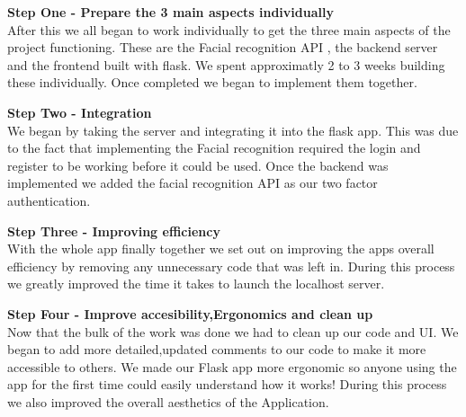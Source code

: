 \documentclass{article}
\begin{document}
\textbf{Step One - Prepare the 3 main aspects individually} \\
After this we all began to work individually to get the three main aspects of the project functioning. These are the Facial recognition API , the backend server and the frontend built with flask. We spent approximatly 2 to 3 weeks building these individually. Once completed we began to implement them together.\medskip

\textbf{Step Two - Integration} \\
We began by taking the server and integrating it into the flask app. This was due to the fact that implementing the Facial recognition required the login and register to be working before it could be used.
Once the backend was implemented we added the facial recognition API as our two factor authentication.\medskip

\textbf{Step Three - Improving efficiency} \\
With the whole app finally together we set out on improving the apps overall efficiency by  removing any unnecessary code that was left in. During this process we greatly improved the time it takes to launch the localhost server.\medskip

\textbf{Step Four - Improve accesibility,Ergonomics and clean up} \\
Now that the bulk of the work was done we had to clean up our code and UI. We began to add more detailed,updated comments to our code to make it more accessible to others. We made our Flask app more ergonomic so anyone using the app for the first time could easily understand how it works! During this process we also improved the overall aesthetics of the Application.
\end{document}
